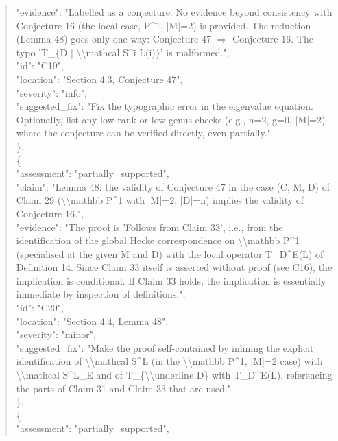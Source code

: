\documentclass[11pt]{article}
\begin{document}
\begin{quote}
      "evidence": "Labelled as a conjecture. No evidence beyond consistency with Conjecture 16 (the local case, P\^{}1, |M|=2) is provided. The reduction (Lemma 48) goes only one way: Conjecture 47 \ensuremath{\Rightarrow} Conjecture 16. The typo 'T\_\{D | \textbackslash{}\textbackslash{}mathcal S\^{}i L(i)\}' is malformed.",\\
      "id": "C19",\\
      "location": "Section 4.3, Conjecture 47",\\
      "severity": "info",\\
      "suggested\_fix": "Fix the typographic error in the eigenvalue equation. Optionally, list any low-rank or low-genus checks (e.g., n=2, g=0, |M|=2) where the conjecture can be verified directly, even partially."\\
    \},\\
    \{\\
      "assessment": "partially\_supported",\\
      "claim": "Lemma 48: the validity of Conjecture 47 in the case (C, M, D) of Claim 29 (\textbackslash{}\textbackslash{}mathbb P\^{}1 with |M|=2, |D|=n) implies the validity of Conjecture 16.",\\
      "evidence": "The proof is 'Follows from Claim 33', i.e., from the identification of the global Hecke correspondence on \textbackslash{}\textbackslash{}mathbb P\^{}1 (specialised at the given M and D) with the local operator T\_D\^{}E(L) of Definition 14. Since Claim 33 itself is asserted without proof (see C16), the implication is conditional. If Claim 33 holds, the implication is essentially immediate by inspection of definitions.",\\
      "id": "C20",\\
      "location": "Section 4.4, Lemma 48",\\
      "severity": "minor",\\
      "suggested\_fix": "Make the proof self-contained by inlining the explicit identification of \textbackslash{}\textbackslash{}mathcal S\^{}L (in the \textbackslash{}\textbackslash{}mathbb P\^{}1, |M|=2 case) with \textbackslash{}\textbackslash{}mathcal S\^{}L\_E and of T\_\{\textbackslash{}\textbackslash{}underline D\} with T\_D\^{}E(L), referencing the parts of Claim 31 and Claim 33 that are used."\\
    \},\\
    \{\\
      "assessment": "partially\_supported",\\

\end{quote}
\end{document}
